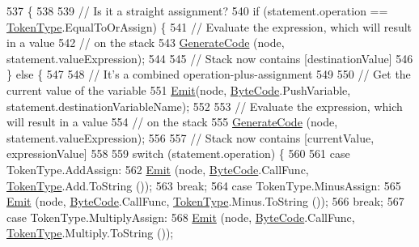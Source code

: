 \begin{DoxyCode}
537                                                                            \{
538 
539             \textcolor{comment}{// Is it a straight assignment?}
540             \textcolor{keywordflow}{if} (statement.operation == \hyperlink{a00026_a301aa7c866593a5b625a8fc158bbeace}{TokenType}.EqualToOrAssign) \{
541                 \textcolor{comment}{// Evaluate the expression, which will result in a value}
542                 \textcolor{comment}{// on the stack}
543                 \hyperlink{a00029_a006f3becd521cc179ba3d3352f6f930b}{GenerateCode} (node, statement.valueExpression);
544 
545                 \textcolor{comment}{// Stack now contains [destinationValue]}
546             \} \textcolor{keywordflow}{else} \{
547 
548                 \textcolor{comment}{// It's a combined operation-plus-assignment}
549 
550                 \textcolor{comment}{// Get the current value of the variable}
551                 \hyperlink{a00029_a774e8c143cdda0584fcfdda98626a83c}{Emit}(node, \hyperlink{a00026_ad5dfb6ee68ca7469623ad3e459f98894}{ByteCode}.PushVariable, statement.destinationVariableName);
552 
553                 \textcolor{comment}{// Evaluate the expression, which will result in a value}
554                 \textcolor{comment}{// on the stack}
555                 \hyperlink{a00029_a006f3becd521cc179ba3d3352f6f930b}{GenerateCode} (node, statement.valueExpression);
556 
557                 \textcolor{comment}{// Stack now contains [currentValue, expressionValue]}
558 
559                 \textcolor{keywordflow}{switch} (statement.operation) \{
560 
561                 \textcolor{keywordflow}{case} TokenType.AddAssign:
562                     \hyperlink{a00029_a774e8c143cdda0584fcfdda98626a83c}{Emit} (node, \hyperlink{a00026_ad5dfb6ee68ca7469623ad3e459f98894}{ByteCode}.CallFunc, \hyperlink{a00026_a301aa7c866593a5b625a8fc158bbeace}{TokenType}.Add.ToString ());
563                     \textcolor{keywordflow}{break};
564                 \textcolor{keywordflow}{case} TokenType.MinusAssign:
565                     \hyperlink{a00029_a774e8c143cdda0584fcfdda98626a83c}{Emit} (node, \hyperlink{a00026_ad5dfb6ee68ca7469623ad3e459f98894}{ByteCode}.CallFunc, \hyperlink{a00026_a301aa7c866593a5b625a8fc158bbeace}{TokenType}.Minus.ToString ());
566                     \textcolor{keywordflow}{break};
567                 \textcolor{keywordflow}{case} TokenType.MultiplyAssign:
568                     \hyperlink{a00029_a774e8c143cdda0584fcfdda98626a83c}{Emit} (node, \hyperlink{a00026_ad5dfb6ee68ca7469623ad3e459f98894}{ByteCode}.CallFunc, \hyperlink{a00026_a301aa7c866593a5b625a8fc158bbeace}{TokenType}.Multiply.ToString ());

\end{DoxyCode}
